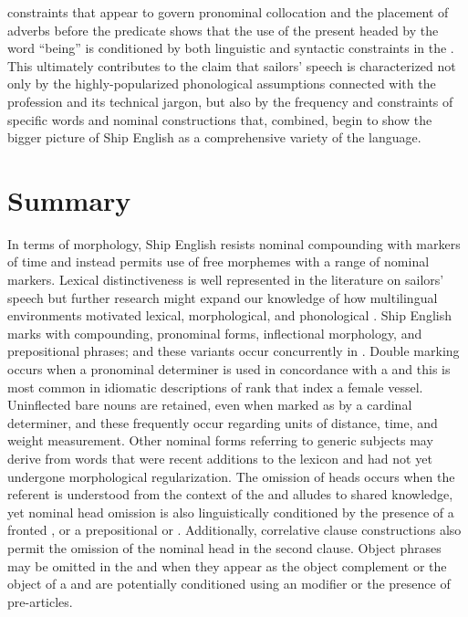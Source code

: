 constraints that appear to govern  pronominal collocation and the placement of adverbs before the predicate shows that the use of the present  headed by the word “being” is conditioned by both linguistic and syntactic constraints in the . This ultimately contributes to the claim that sailors’ speech is characterized not only by the highly-popularized phonological assumptions connected with the profession and its technical jargon, but also by the frequency and constraints of specific words and nominal constructions that, combined, begin to show the bigger picture of Ship English as a comprehensive variety of the language.  

\section{{Summary} }%

In terms of morphology, Ship English resists nominal compounding with markers of time and instead permits use of free morphemes with a range of nominal markers. Lexical distinctiveness is well represented in the literature on sailors’ speech but further research might expand our knowledge of how multilingual environments motivated lexical, morphological, and phonological . Ship English marks  with  compounding,  pronominal forms, inflectional morphology, and prepositional phrases; and these variants occur concurrently in . Double  marking occurs when a pronominal  determiner is used in concordance with a  and this is most common in idiomatic descriptions of rank that index a female vessel. Uninflected bare nouns are retained, even when marked as  by a cardinal determiner, and these frequently occur regarding units of distance, time, and weight measurement. Other  nominal forms referring to generic subjects may derive from words that were recent additions to the lexicon and had not yet undergone morphological regularization. The omission of  heads occurs when the referent is understood from the context of the  and alludes to shared knowledge, yet nominal head omission is also linguistically conditioned by the presence of a fronted , or a prepositional or . Additionally, correlative clause constructions also permit the omission of the nominal head in the second clause. Object  phrases may be omitted in the  and when they appear as the object complement or the object of a  and are potentially conditioned using an  modifier or the presence of pre-articles.

